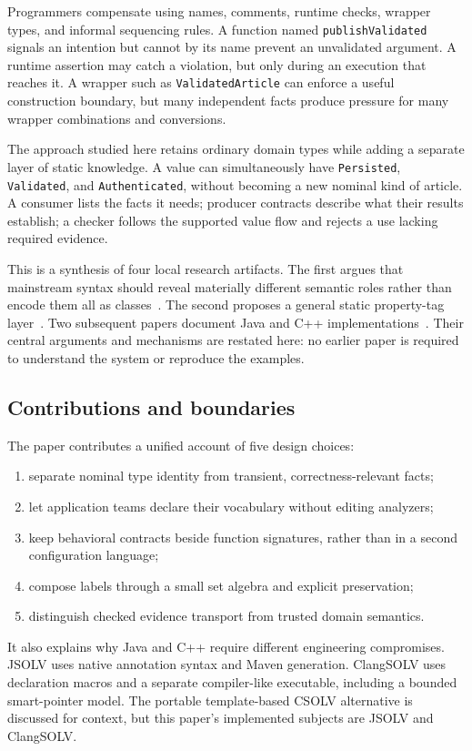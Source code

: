 \documentclass[11pt]{article}
\begin{document}
Programmers compensate using names, comments, runtime checks, wrapper types,
and informal sequencing rules. A function named \texttt{publishValidated}
signals an intention but cannot by its name prevent an unvalidated argument.
A runtime assertion may catch a violation, but only during an execution that
reaches it. A wrapper such as \texttt{ValidatedArticle} can enforce a useful
construction boundary, but many independent facts produce pressure for many
wrapper combinations and conversions.

The approach studied here retains ordinary domain types while adding a
separate layer of static knowledge. A value can simultaneously have
\texttt{Persisted}, \texttt{Validated}, and \texttt{Authenticated}, without
becoming a new nominal kind of article. A consumer lists the facts it needs;
producer contracts describe what their results establish; a checker follows
the supported value flow and rejects a use lacking required evidence.

This is a synthesis of four local research artifacts. The first argues that
mainstream syntax should reveal materially different semantic roles rather
than encode them all as classes~\cite{roles}. The second proposes a general
static property-tag layer~\cite{ideation}. Two subsequent papers document
Java and C++ implementations~\cite{java-paper,cpp-paper}. Their central
arguments and mechanisms are restated here: no earlier paper is required
to understand the system or reproduce the examples.

\subsection{Contributions and boundaries}
The paper contributes a unified account of five design choices:
\begin{enumerate}[nosep]
\item separate nominal type identity from transient, correctness-relevant facts;
\item let application teams declare their vocabulary without editing analyzers;
\item keep behavioral contracts beside function signatures, rather than in a
second configuration language;
\item compose labels through a small set algebra and explicit preservation;
\item distinguish checked evidence transport from trusted domain semantics.
\end{enumerate}
It also explains why Java and C++ require different engineering compromises.
JSOLV uses native annotation syntax and Maven generation. ClangSOLV uses
declaration macros and a separate compiler-like executable, including a
bounded smart-pointer model. The portable template-based CSOLV alternative
is discussed for context, but this paper's implemented subjects are JSOLV
and ClangSOLV.
\end{document}
